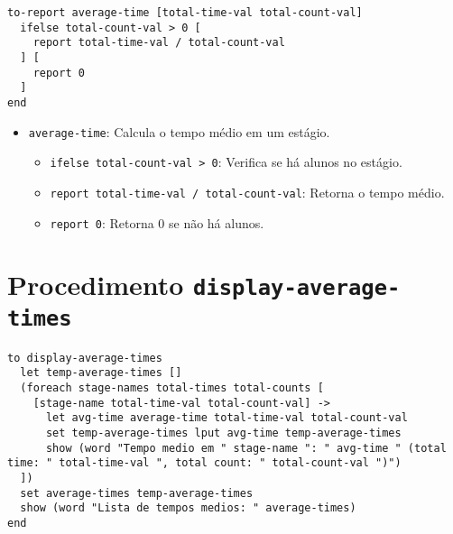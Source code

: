 \documentclass{article}
\begin{document}
\begin{lstlisting}[language=NetLogo]
to-report average-time [total-time-val total-count-val]
  ifelse total-count-val > 0 [
    report total-time-val / total-count-val
  ] [
    report 0
  ]
end
\end{lstlisting}

\begin{itemize}
    \item \texttt{average-time}: Calcula o tempo médio em um estágio.
    \begin{itemize}
        \item \texttt{ifelse total-count-val > 0}: Verifica se há alunos no estágio.
        \item \texttt{report total-time-val / total-count-val}: Retorna o tempo médio.
        \item \texttt{report 0}: Retorna 0 se não há alunos.
    \end{itemize}
\end{itemize}

\section{Procedimento \texttt{display-average-times}}

\begin{lstlisting}[language=NetLogo]
to display-average-times
  let temp-average-times []
  (foreach stage-names total-times total-counts [
    [stage-name total-time-val total-count-val] ->
      let avg-time average-time total-time-val total-count-val
      set temp-average-times lput avg-time temp-average-times
      show (word "Tempo medio em " stage-name ": " avg-time " (total time: " total-time-val ", total count: " total-count-val ")")
  ])
  set average-times temp-average-times
  show (word "Lista de tempos medios: " average-times)
end
\end{lstlisting}
\end{document}

